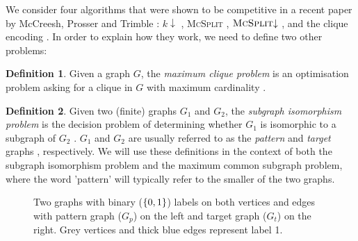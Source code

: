 \documentclass{l4proj}
\theoremstyle{definition}
\newtheorem{definition}{Definition}[chapter]
\theoremstyle{remark}
\begin{document}
We consider four algorithms that were shown to be competitive in a recent paper by
McCreesh, Prosser and Trimble \cite{DBLP:conf/ijcai/McCreeshPT17}: $k{\downarrow}$
\cite{DBLP:conf/aaai/HoffmannMR17}, \textsc{McSplit}
\cite{DBLP:conf/ijcai/McCreeshPT17}, $\textsc{McSplit}{\downarrow}$
\cite{DBLP:conf/ijcai/McCreeshPT17}, and the clique encoding
\cite{DBLP:conf/cp/McCreeshNPS16}. In order to explain how they work, we need to
define two other problems:

\begin{definition}
  Given a graph $G$, the \emph{maximum clique problem} is an optimisation problem
  asking for a clique in $G$ with maximum cardinality
  \cite{DBLP:journals/jgo/PardalosX94a}.
\end{definition}

\begin{definition}
  Given two (finite) graphs $G_1$ and $G_2$, the \emph{subgraph isomorphism
    problem} is the decision problem of determining whether $G_1$ is isomorphic
  to a subgraph of $G_2$ \cite{DBLP:conf/stoc/Cook71}. $G_1$ and $G_2$ are
  usually referred to as the \emph{pattern} and \emph{target} graphs
  \cite{DBLP:journals/ai/Solnon10, Valiente97analgorithm,
    DBLP:journals/constraints/ZampelliDS10}, respectively. We will use these
  definitions in the context of both the subgraph isomorphism problem and the
  maximum common subgraph problem, where the word 'pattern' will typically refer
  to the smaller of the two graphs.
\end{definition}

\begin{figure}
  \centering
  \caption{Two graphs with binary ($\protect{\{ 0, 1 \}}$) labels on both vertices
    and edges with pattern graph ($G_p$) on the left and target graph ($G_t$) on the
    right. Grey vertices and thick blue edges represent label 1.}
  \label{fig:graphs}
\end{figure}
\end{document}
